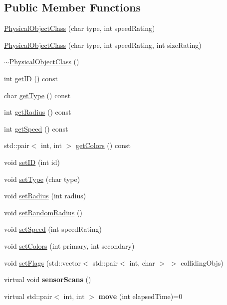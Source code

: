 \subsection*{Public Member Functions}
\begin{DoxyCompactItemize}
\item 
\hyperlink{classBaseObject_a01b3409bbc649691542838aa615b8ec8}{Physical\-Object\-Class} (char type, int speed\-Rating)
\item 
\hyperlink{classBaseObject_abd4b29e844cf58c418ab3a0a882cd05e}{Physical\-Object\-Class} (char type, int speed\-Rating, int size\-Rating)
\item 
\hyperlink{classBaseObject_a97db381b4e2e357eeb8aeeb580d0b7bd}{$\sim$\-Physical\-Object\-Class} ()
\item 
int \hyperlink{classBaseObject_a7844d0e02e1a3b56c7d539c1a711d463}{get\-I\-D} () const 
\item 
char \hyperlink{classBaseObject_a81a433e9083d8377d6e8fa53aa35b1ba}{get\-Type} () const 
\item 
int \hyperlink{classBaseObject_a0649ac3d6d0cfc97eb6534ddd94f3b65}{get\-Radius} () const 
\item 
int \hyperlink{classBaseObject_ad26186eed66b0773c9d700b425a9c2dd}{get\-Speed} () const 
\item 
std\-::pair$<$ int, int $>$ \hyperlink{classBaseObject_ab9910ef1b73dce7ec9b67d4945ae178d}{get\-Colors} () const 
\item 
void \hyperlink{classBaseObject_a21e0e19329f420eec3b208a0df910f9e}{set\-I\-D} (int id)
\item 
void \hyperlink{classBaseObject_a4719728cadae0cbcca31751f6f0a1402}{set\-Type} (char type)
\item 
void \hyperlink{classBaseObject_a79ac4583ff679cf99b890c2db60f9c67}{set\-Radius} (int radius)
\item 
void \hyperlink{classBaseObject_a81552d585e08d164cff9089573012155}{set\-Random\-Radius} ()
\item 
void \hyperlink{classBaseObject_a9f17bf0caea252ed80504368804ef9b9}{set\-Speed} (int speed\-Rating)
\item 
void \hyperlink{classBaseObject_acd3ec10d8cc4e948dcaceeecdac3cd7b}{set\-Colors} (int primary, int secondary)
\item 
void \hyperlink{classBaseObject_a2caac4e8a3585eae128783f449563326}{set\-Flags} (std\-::vector$<$ std\-::pair$<$ int, char $>$ $>$ colliding\-Objs)
\item 
\hypertarget{classBaseObject_a44e39835933a0e9711766e574a7a129e}{virtual void {\bfseries sensor\-Scans} ()}\label{classBaseObject_a44e39835933a0e9711766e574a7a129e}

\item 
\hypertarget{classBaseObject_ae7155529dbc7e48020e62e113f99c495}{virtual std\-::pair$<$ int, int $>$ {\bfseries move} (int elapsed\-Time)=0}\label{classBaseObject_ae7155529dbc7e48020e62e113f99c495}

\end{DoxyCompactItemize}
